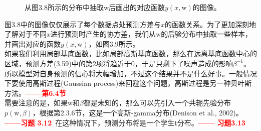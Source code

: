 \documentclass[b5paper]{book}
\numberwithin{equation}{chapter}
\newcommand {\bw} {\boldsymbol{\mathrm{w}}}
\begin{document}
{\begin{figure}[H]
\begin{minipage}[t]{0.5\linewidth}
		\label{fig:3-9d}
		\end{minipage}
		\caption{从图3.8所示的分布中抽取$\bw$后画出的对应函数$y(x,\bw)$的图像。}
	\end{figure}
	\indent 图3.8中的图像仅仅展示了每个数据点处预测方差与$x$的函数关系。为了更加深刻地了解对于不同$x$进行预测时产生的协方差，我们从$\bw$的后验分布中抽取一些样本，并画出对应的函数$y(x,\bw)$，如图3.9所示。\\
	\indent 如果我们利用局部基底函数，比如局部高斯基底函数，那么在远离基底函数中心的区域，预测方差(3.59)中的第2项将趋近于0，于是只剩下了噪声造成的影响$\beta^{-1}$。所以模型对自身预测的信心将大幅增加，不过这个结果并不是什么好事。一般情况下要使用高斯过程(Gaussian process)来回避这个问题，高斯过程是另一种贝叶斯方法。\textcolor{red}{\textbf{——第6.4节}}\\
	\indent 需要注意的是，如果$\bw$和$\beta$都是未知的，那么可以先引入一个共轭先验分布$p(\bw,\beta)$，根据第2.3.6节，这是一个高斯-gamma分布(Denison et al., 2002)。\textcolor{red}{\textbf{——习题 3.12}}\ 在这种情况下，预测分布将是一个学生t分布。\textcolor{red}{\textbf{—— 习题3.13}}
	}
\end{document}
